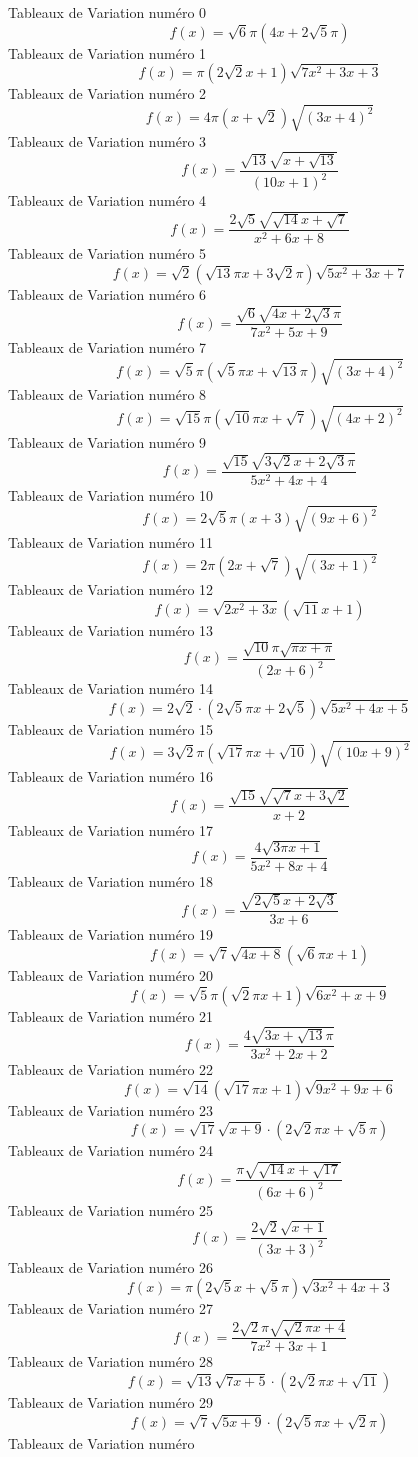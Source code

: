 \documentclass{article}
\begin{document}
Tableaux de Variation num\'ero 0 \[f(x) = \sqrt{6} \pi \left(4 x + 2 \sqrt{5} \pi\right)\]Tableaux de Variation num\'ero 1 \[f(x) = \pi \left(2 \sqrt{2} x + 1\right) \sqrt{7 x^{2} + 3 x + 3}\]Tableaux de Variation num\'ero 2 \[f(x) = 4 \pi \left(x + \sqrt{2}\right) \sqrt{\left(3 x + 4\right)^{2}}\]Tableaux de Variation num\'ero 3 \[f(x) = \frac{\sqrt{13} \sqrt{x + \sqrt{13}}}{\left(10 x + 1\right)^{2}}\]Tableaux de Variation num\'ero 4 \[f(x) = \frac{2 \sqrt{5} \sqrt{\sqrt{14} x + \sqrt{7}}}{x^{2} + 6 x + 8}\]Tableaux de Variation num\'ero 5 \[f(x) = \sqrt{2} \left(\sqrt{13} \pi x + 3 \sqrt{2} \pi\right) \sqrt{5 x^{2} + 3 x + 7}\]Tableaux de Variation num\'ero 6 \[f(x) = \frac{\sqrt{6} \sqrt{4 x + 2 \sqrt{3} \pi}}{7 x^{2} + 5 x + 9}\]Tableaux de Variation num\'ero 7 \[f(x) = \sqrt{5} \pi \left(\sqrt{5} \pi x + \sqrt{13} \pi\right) \sqrt{\left(3 x + 4\right)^{2}}\]Tableaux de Variation num\'ero 8 \[f(x) = \sqrt{15} \pi \left(\sqrt{10} \pi x + \sqrt{7}\right) \sqrt{\left(4 x + 2\right)^{2}}\]Tableaux de Variation num\'ero 9 \[f(x) = \frac{\sqrt{15} \sqrt{3 \sqrt{2} x + 2 \sqrt{3} \pi}}{5 x^{2} + 4 x + 4}\]Tableaux de Variation num\'ero 10 \[f(x) = 2 \sqrt{5} \pi \left(x + 3\right) \sqrt{\left(9 x + 6\right)^{2}}\]Tableaux de Variation num\'ero 11 \[f(x) = 2 \pi \left(2 x + \sqrt{7}\right) \sqrt{\left(3 x + 1\right)^{2}}\]Tableaux de Variation num\'ero 12 \[f(x) = \sqrt{2 x^{2} + 3 x} \left(\sqrt{11} x + 1\right)\]Tableaux de Variation num\'ero 13 \[f(x) = \frac{\sqrt{10} \pi \sqrt{\pi x + \pi}}{\left(2 x + 6\right)^{2}}\]Tableaux de Variation num\'ero 14 \[f(x) = 2 \sqrt{2} \cdot \left(2 \sqrt{5} \pi x + 2 \sqrt{5}\right) \sqrt{5 x^{2} + 4 x + 5}\]Tableaux de Variation num\'ero 15 \[f(x) = 3 \sqrt{2} \pi \left(\sqrt{17} \pi x + \sqrt{10}\right) \sqrt{\left(10 x + 9\right)^{2}}\]Tableaux de Variation num\'ero 16 \[f(x) = \frac{\sqrt{15} \sqrt{\sqrt{7} x + 3 \sqrt{2}}}{x + 2}\]Tableaux de Variation num\'ero 17 \[f(x) = \frac{4 \sqrt{3 \pi x + 1}}{5 x^{2} + 8 x + 4}\]Tableaux de Variation num\'ero 18 \[f(x) = \frac{\sqrt{2 \sqrt{5} x + 2 \sqrt{3}}}{3 x + 6}\]Tableaux de Variation num\'ero 19 \[f(x) = \sqrt{7} \sqrt{4 x + 8} \left(\sqrt{6} \pi x + 1\right)\]Tableaux de Variation num\'ero 20 \[f(x) = \sqrt{5} \pi \left(\sqrt{2} \pi x + 1\right) \sqrt{6 x^{2} + x + 9}\]Tableaux de Variation num\'ero 21 \[f(x) = \frac{4 \sqrt{3 x + \sqrt{13} \pi}}{3 x^{2} + 2 x + 2}\]Tableaux de Variation num\'ero 22 \[f(x) = \sqrt{14} \left(\sqrt{17} \pi x + 1\right) \sqrt{9 x^{2} + 9 x + 6}\]Tableaux de Variation num\'ero 23 \[f(x) = \sqrt{17} \sqrt{x + 9} \cdot \left(2 \sqrt{2} \pi x + \sqrt{5} \pi\right)\]Tableaux de Variation num\'ero 24 \[f(x) = \frac{\pi \sqrt{\sqrt{14} x + \sqrt{17}}}{\left(6 x + 6\right)^{2}}\]Tableaux de Variation num\'ero 25 \[f(x) = \frac{2 \sqrt{2} \sqrt{x + 1}}{\left(3 x + 3\right)^{2}}\]Tableaux de Variation num\'ero 26 \[f(x) = \pi \left(2 \sqrt{5} x + \sqrt{5} \pi\right) \sqrt{3 x^{2} + 4 x + 3}\]Tableaux de Variation num\'ero 27 \[f(x) = \frac{2 \sqrt{2} \pi \sqrt{\sqrt{2} \pi x + 4}}{7 x^{2} + 3 x + 1}\]Tableaux de Variation num\'ero 28 \[f(x) = \sqrt{13} \sqrt{7 x + 5} \cdot \left(2 \sqrt{2} \pi x + \sqrt{11}\right)\]Tableaux de Variation num\'ero 29 \[f(x) = \sqrt{7} \sqrt{5 x + 9} \cdot \left(2 \sqrt{5} \pi x + \sqrt{2} \pi\right)\]Tableaux de Variation num\'ero 
\end{document}
